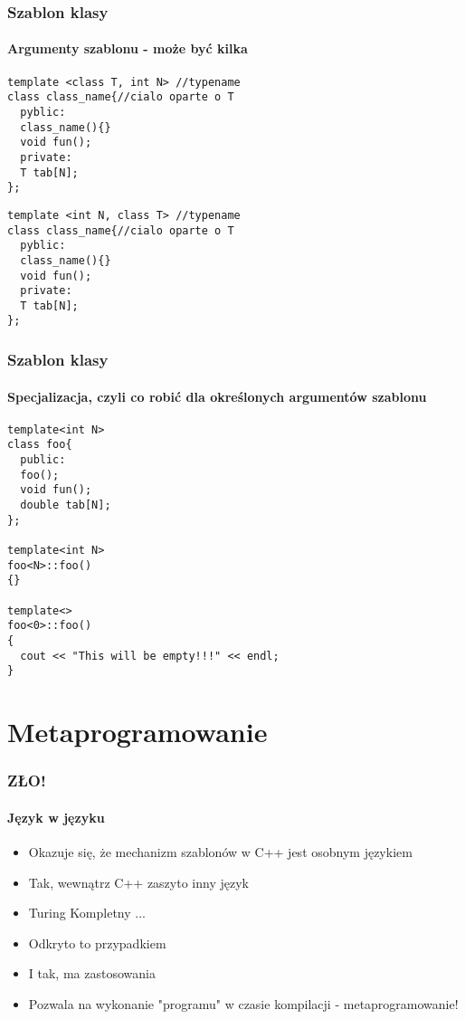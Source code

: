 \documentclass[10pt]{beamer}
\begin{document}
\begin{frame}[fragile]
  \frametitle{Szablon klasy}
  \framesubtitle{Argumenty szablonu - może być kilka}
  
  \begin{lstlisting}
template <class T, int N> //typename
class class_name{//cialo oparte o T
  pyblic:
  class_name(){}
  void fun();
  private:
  T tab[N];
};
\end{lstlisting}

\begin{lstlisting}
template <int N, class T> //typename
class class_name{//cialo oparte o T
  pyblic:
  class_name(){}
  void fun();
  private:
  T tab[N];
};
\end{lstlisting}
  
\end{frame}

\begin{frame}[fragile]
  \frametitle{Szablon klasy}
  \framesubtitle{Specjalizacja, czyli co robić dla określonych argumentów szablonu}
\begin{lstlisting}
template<int N>
class foo{
  public:
  foo();
  void fun();
  double tab[N];
};

template<int N>
foo<N>::foo()
{}

template<>
foo<0>::foo()
{
  cout << "This will be empty!!!" << endl;
}
\end{lstlisting}
\end{frame}

\section{Metaprogramowanie}

\begin{frame}[fragile]
  \frametitle{ZŁO!}
  \framesubtitle{Język w języku}
  \begin{itemize}
    \item Okazuje się, że mechanizm szablonów w C++ jest osobnym językiem
    \item Tak, wewnątrz C++ zaszyto inny język
    \item Turing Kompletny ...
    \item Odkryto to przypadkiem
    \item I tak, ma zastosowania
    \item Pozwala na wykonanie "programu" w czasie kompilacji - metaprogramowanie!
  \end{itemize}
\end{frame}
\end{document}
